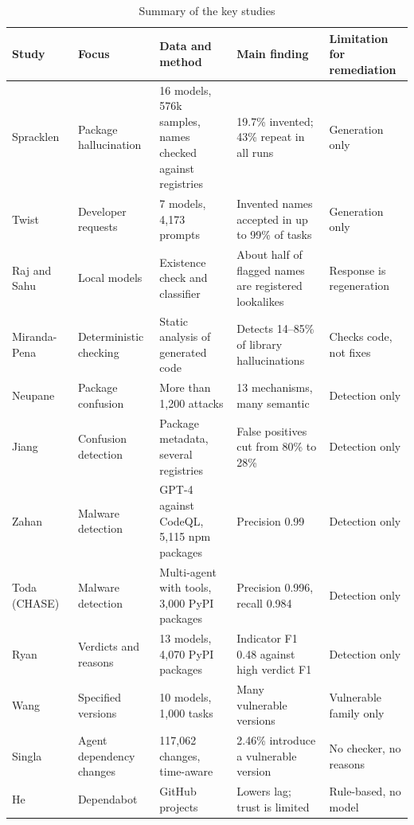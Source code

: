 \documentclass[conference]{IEEEtran}
\begin{document}
\begin{table}[t]
\caption{Summary of the key studies}
\label{tab:survey}
\centering
\small
\setlength{\tabcolsep}{3pt}
\begin{tabular}{@{}p{24mm}p{30mm}p{42mm}p{42mm}p{36mm}@{}}
\toprule
Study & Focus & Data and method & Main finding & Limitation for remediation \\
\midrule
Spracklen~\cite{spracklen2025} & Package hallucination & 16 models, 576k samples, names checked against registries & 19.7\% invented; 43\% repeat in all runs & Generation only \\
Twist~\cite{twist2026} & Developer requests & 7 models, 4{,}173 prompts & Invented names accepted in up to 99\% of tasks & Generation only \\
Raj and Sahu~\cite{raj2026} & Local models & Existence check and classifier & About half of flagged names are registered lookalikes & Response is regeneration \\
Miranda-Pena~\cite{mirandapena2026} & Deterministic checking & Static analysis of generated code & Detects 14--85\% of library hallucinations & Checks code, not fixes \\
Neupane~\cite{neupane2023} & Package confusion & More than 1{,}200 attacks & 13 mechanisms, many semantic & Detection only \\
Jiang~\cite{jiang2026} & Confusion detection & Package metadata, several registries & False positives cut from 80\% to 28\% & Detection only \\
Zahan~\cite{zahan2025} & Malware detection & GPT-4 against CodeQL, 5{,}115 npm packages & Precision 0.99 & Detection only \\
Toda (CHASE)~\cite{toda2025} & Malware detection & Multi-agent with tools, 3{,}000 PyPI packages & Precision 0.996, recall 0.984 & Detection only \\
Ryan~\cite{ryan2026} & Verdicts and reasons & 13 models, 4{,}070 PyPI packages & Indicator F1 0.48 against high verdict F1 & Detection only \\
Wang~\cite{wang2026} & Specified versions & 10 models, 1{,}000 tasks & Many vulnerable versions & Vulnerable family only \\
Singla~\cite{singla2026} & Agent dependency changes & 117{,}062 changes, time-aware & 2.46\% introduce a vulnerable version & No checker, no reasons \\
He~\cite{he2023} & Dependabot & GitHub projects & Lowers lag; trust is limited & Rule-based, no model \\
\bottomrule
\end{tabular}
\end{table}
\end{document}
